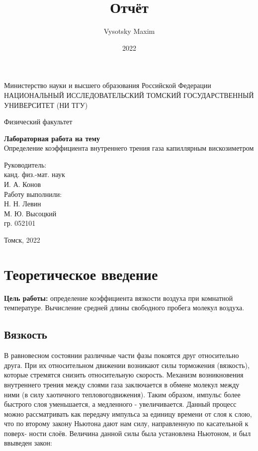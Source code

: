 \documentclass[a4paper,12pt]{article}
\author{Vysotsky Maxim}
\title{Отчёт}
\date{2022}
\begin{document}
	\begin{titlepage}
		\begin{center}
			{Министерство науки и высшего образования Российской Федерации
				НАЦИОНАЛЬНЫЙ ИССЛЕДОВАТЕЛЬСКИЙ ТОМСКИЙ
				ГОСУДАРСТВЕННЫЙ УНИВЕРСИТЕТ (НИ ТГУ)}
		\end{center}
		\begin{center}
			{Физический факультет}
		\end{center}
		
		
		\vspace{8cm}
		{
			\begin{center}
				{\bf Лабораторная работа на тему}\\
				Определение коэффициента внутреннего трения газа
				капиллярным вискозиметром
			\end{center}
		}
		\vspace{2cm}
		\begin{flushright}
			{Руководитель:\\ канд. физ.-мат. наук\\
				И. А. Конов\\
				Работу выполнили:\\
				Н. Н. Левин\\
				М. Ю. Высоцкий\\
				\vspace{0.2cm}
				гр. 052101}
		\end{flushright}
		\vspace{3cm}
		\begin{center}
			Томск, 2022
		\end{center}
	\end{titlepage}
	
\section{Теоретическое введение}
\textbf{Цель работы:} определение коэффициента вязкости воздуха при
комнатной температуре. Вычисление средней длины свободного
пробега молекул воздуха.
	
\subsection{Вязкость}
В равновесном состоянии различные части фазы покоятся друг относительно друга. При их относительном движении возникают силы торможения (вязкость), которые стремятся снизить относительную скорость. Механизм возникновения внутреннего трения между слоями газа заключается в обмене молекул между ними (в силу хаотичного тепловогодвижения). Таким образом, импульс более быстрого слоя уменьшается, а
медленного - увеличивается. Данный процесс можно рассматривать как
передачу импульса за единицу времени от слоя к слою, что по второму
закону Ньютона дают нам силу, направленную по касательной к поверх-
ности слоёв. Величина данной силы была установлена Ньютоном, и был
ввыведен закон:
	
\end{document}
